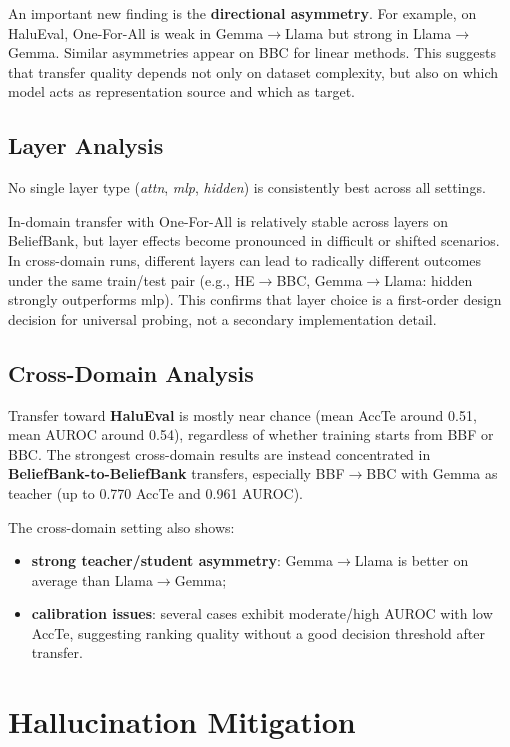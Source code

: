An important new finding is the \textbf{directional asymmetry}. For example, on HaluEval, One-For-All is weak in Gemma$\rightarrow$Llama but strong in Llama$\rightarrow$Gemma. Similar asymmetries appear on BBC for linear methods. This suggests that transfer quality depends not only on dataset complexity, but also on which model acts as representation source and which as target.

\subsection{Layer Analysis}
No single layer type (\textit{attn}, \textit{mlp}, \textit{hidden}) is consistently best across all settings.

In-domain transfer with One-For-All is relatively stable across layers on BeliefBank, but layer effects become pronounced in difficult or shifted scenarios. In cross-domain runs, different layers can lead to radically different outcomes under the same train/test pair (e.g., HE$\rightarrow$BBC, Gemma$\rightarrow$Llama: hidden strongly outperforms mlp). This confirms that layer choice is a first-order design decision for universal probing, not a secondary implementation detail.

\subsection{Cross-Domain Analysis}


Transfer toward \textbf{HaluEval} is mostly near chance (mean AccTe around 0.51, mean AUROC around 0.54), regardless of whether training starts from BBF or BBC. The strongest cross-domain results are instead concentrated in \textbf{BeliefBank-to-BeliefBank} transfers, especially BBF$\rightarrow$BBC with Gemma as teacher (up to 0.770 AccTe and 0.961 AUROC).

The cross-domain setting also shows:
\begin{itemize}
    \item \textbf{strong teacher/student asymmetry}: Gemma$\rightarrow$Llama is better on average than Llama$\rightarrow$Gemma;
    \item \textbf{calibration issues}: several cases exhibit moderate/high AUROC with low AccTe, suggesting ranking quality without a good decision threshold after transfer.
\end{itemize}

\section{Hallucination Mitigation}

